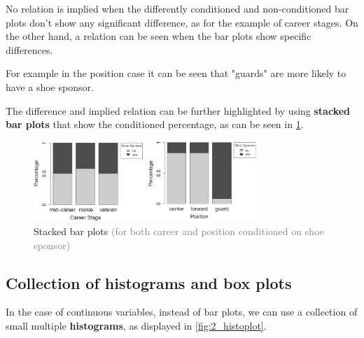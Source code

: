 No relation is implied when the differently conditioned and non-conditioned bar plots don't show any significant difference, as for the example of career stages. On the other hand, a relation can be seen when the bar plots show specific differences. \begin{note}For example in the position case it can be seen that "guards" are more likely to have a shoe sponsor.\end{note}

The difference and implied relation can be further highlighted by using \textbf{stacked bar plots} that show the conditioned percentage, as can be seen in \ref{fig:2_barplot_stack}.

\begin{figure}[H]
  \centering
  \includegraphics[width=0.75\textwidth]{assets/visualization_and_extraction/feature_relation/bar_stacked.png}
  \caption{Stacked bar plots \textcolor{gray}{\footnotesize (for both career and position conditioned on shoe sponsor)}}
  \label{fig:2_barplot_stack}
\end{figure}

\subsection*{Collection of histograms and box plots}

In the case of continuous variables, instead of bar plots, we can use a collection of small multiple \textbf{histograms}, as displayed in \ref{fig:2_histoplot}.

